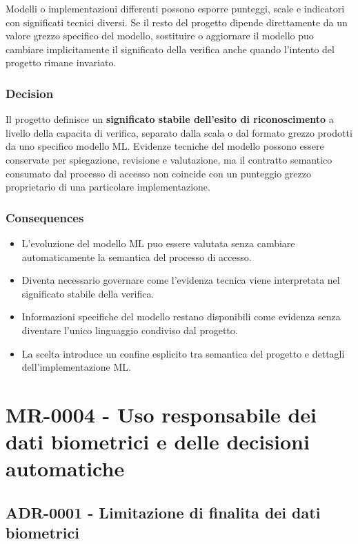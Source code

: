 \documentclass[
  10pt,
]{article}
\providecommand{\tightlist}{%
  \setlength{\itemsep}{0pt}\setlength{\parskip}{0pt}}
\begin{document}
Modelli o implementazioni differenti possono esporre punteggi, scale e
indicatori con significati tecnici diversi. Se il resto del progetto
dipende direttamente da un valore grezzo specifico del modello,
sostituire o aggiornare il modello puo cambiare implicitamente il
significato della verifica anche quando l'intento del progetto rimane
invariato.

\subsubsection{Decision}\label{decision-5}

Il progetto definisce un \textbf{significato stabile dell'esito di
riconoscimento} a livello della capacita di verifica, separato dalla
scala o dal formato grezzo prodotti da uno specifico modello ML.
Evidenze tecniche del modello possono essere conservate per spiegazione,
revisione e valutazione, ma il contratto semantico consumato dal
processo di accesso non coincide con un punteggio grezzo proprietario di
una particolare implementazione.

\subsubsection{Consequences}\label{consequences-5}

\begin{itemize}
\tightlist
\item
  L'evoluzione del modello ML puo essere valutata senza cambiare
  automaticamente la semantica del processo di accesso.
\item
  Diventa necessario governare come l'evidenza tecnica viene
  interpretata nel significato stabile della verifica.
\item
  Informazioni specifiche del modello restano disponibili come evidenza
  senza diventare l'unico linguaggio condiviso dal progetto.
\item
  La scelta introduce un confine esplicito tra semantica del progetto e
  dettagli dell'implementazione ML.
\end{itemize}

\section{MR-0004 - Uso responsabile dei dati biometrici e delle
decisioni
automatiche}\label{mr-0004---uso-responsabile-dei-dati-biometrici-e-delle-decisioni-automatiche}

\subsection{ADR-0001 - Limitazione di finalita dei dati
biometrici}\label{adr-0001---limitazione-di-finalita-dei-dati-biometrici}
\end{document}
